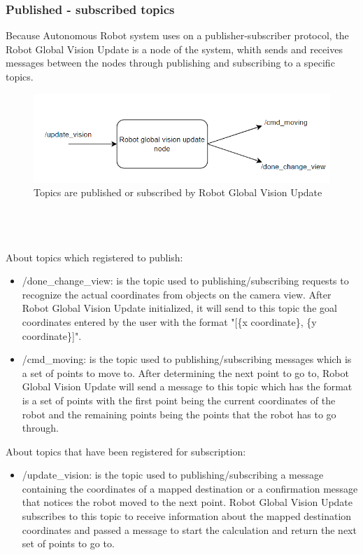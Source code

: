 \documentclass[13pt,a4paper]{article}
\begin{document}
	\subsubsection{Published - subscribed topics}
	Because Autonomous Robot system uses on a publisher-subscriber protocol, the Robot Global Vision Update is a node of the system, whith sends and receives messages between the nodes through publishing and subscribing to a specific topics.
	\begin{figure}[!h]
		\centering
		\includegraphics[width=1\textwidth]{Robot_Global_Vision_Update/RGVU_node_pub_sub.png}
		\caption{Topics are published or subscribed by Robot Global Vision Update}
	\end{figure} \\ \\ \\
	About topics which registered to publish:
	\begin{itemize}
		\item /done\_change\_view: is the topic used to publishing/subscribing requests to recognize the actual coordinates from objects on the camera view. After Robot Global Vision Update initialized, it will send to this topic the goal coordinates entered by the user with the format "[\{x coordinate\}, \{y coordinate\}]".
		\item /cmd\_moving: is the topic used to publishing/subscribing messages which is a set of points to move to. After determining the next point to go to, Robot Global Vision Update will send a message to this topic which has the format is a set of points with the first point being the current coordinates of the robot and the remaining points being the points that the robot has to go through.
	\end{itemize}
	About topics that have been registered for subscription:
	\begin{itemize}
		\item /update\_vision: is the topic used to publishing/subscribing a message containing the coordinates of a mapped destination or a confirmation message that notices the robot moved to the next point. Robot Global Vision Update subscribes to this topic to receive information about the mapped destination coordinates and passed a message to start the calculation and return the next set of points to go to.
	\end{itemize}
	
\end{document}
